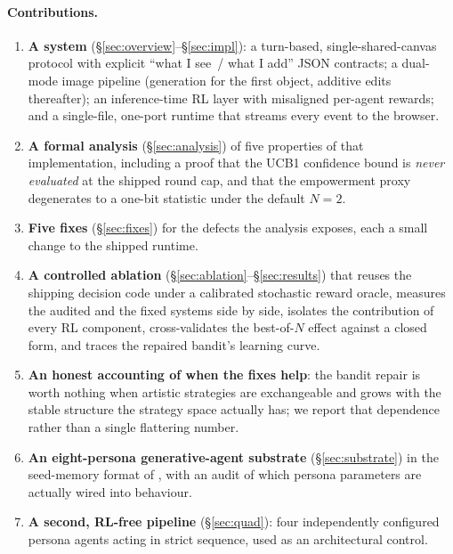\documentclass[11pt]{article}
\theoremstyle{plain}
\theoremstyle{definition}
\begin{document}
\paragraph{Contributions.}
\begin{enumerate}[leftmargin=1.3em,itemsep=1pt,topsep=2pt]
\item \textbf{A system} (\S\ref{sec:overview}--\S\ref{sec:impl}): a turn-based,
      single-shared-canvas protocol with explicit ``what I see~/ what I add''
      JSON contracts; a dual-mode image pipeline (generation for the first
      object, additive edits thereafter); an inference-time RL layer with
      misaligned per-agent rewards; and a single-file, one-port runtime that
      streams every event to the browser.
\item \textbf{A formal analysis} (\S\ref{sec:analysis}) of five properties of
      that implementation, including a proof that the UCB1 confidence bound is
      \emph{never evaluated} at the shipped round cap, and that the empowerment
      proxy degenerates to a one-bit statistic under the default $N{=}2$.
\item \textbf{Five fixes} (\S\ref{sec:fixes}) for the defects the analysis
      exposes, each a small change to the shipped runtime.
\item \textbf{A controlled ablation} (\S\ref{sec:ablation}--\S\ref{sec:results})
      that reuses the shipping decision code under a calibrated stochastic
      reward oracle, measures the audited and the fixed systems side by side,
      isolates the contribution of every RL component, cross-validates the
      best-of-$N$ effect against a closed form, and traces the repaired bandit's
      learning curve.
\item \textbf{An honest accounting of when the fixes help}: the bandit repair is
      worth nothing when artistic strategies are exchangeable and grows with the
      stable structure the strategy space actually has; we report that
      dependence rather than a single flattering number.
\item \textbf{An eight-persona generative-agent substrate}
      (\S\ref{sec:substrate}) in the seed-memory format of
      \citet{park2023generative}, with an audit of which persona parameters are
      actually wired into behaviour.
\item \textbf{A second, RL-free pipeline} (\S\ref{sec:quad}): four
      independently configured persona agents acting in strict sequence, used as
      an architectural control.
\end{enumerate}
\end{document}
